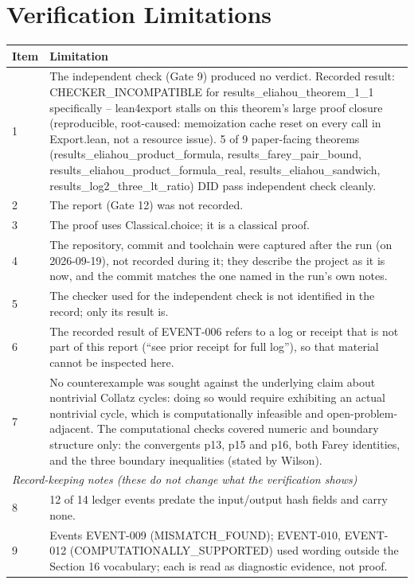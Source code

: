 \documentclass[11pt]{article}
\begin{document}
\section{Verification Limitations}
\begin{longtable}{p{}p{}}
\toprule Item & Limitation \\ \midrule \endhead
1 & The independent check (Gate 9) produced no verdict. Recorded result: CHECKER\_INCOMPATIBLE for results\_eliahou\_theorem\_1\_1 specifically -- lean4export stalls on this theorem's large proof closure (reproducible, root-caused: memoization cache reset on every call in Export.lean, not a resource issue). 5 of 9 paper-facing theorems (results\_eliahou\_product\_formula, results\_farey\_pair\_bound, results\_eliahou\_product\_formula\_real, results\_eliahou\_sandwich, results\_log2\_three\_lt\_ratio) DID pass independent check cleanly. \\
2 & The report (Gate 12) was not recorded. \\
3 & The proof uses Classical.choice; it is a classical proof. \\
4 & The repository, commit and toolchain were captured after the run (on 2026-09-19), not recorded during it; they describe the project as it is now, and the commit matches the one named in the run's own notes. \\
5 & The checker used for the independent check is not identified in the record; only its result is. \\
6 & The recorded result of EVENT-006 refers to a log or receipt that is not part of this report (``see prior receipt for full log''), so that material cannot be inspected here. \\
7 & No counterexample was sought against the underlying claim about nontrivial Collatz cycles: doing so would require exhibiting an actual nontrivial cycle, which is computationally infeasible and open-problem-adjacent. The computational checks covered numeric and boundary structure only: the convergents p13, p15 and p16, both Farey identities, and the three boundary inequalities (stated by Wilson). \\
\midrule \multicolumn{2}{l}{\textit{Record-keeping notes (these do not change what the verification shows)}} \\ \midrule
8 & 12 of 14 ledger events predate the input/output hash fields and carry none. \\
9 & Events EVENT-009 (MISMATCH\_FOUND); EVENT-010, EVENT-012 (COMPUTATIONALLY\_SUPPORTED) used wording outside the Section 16 vocabulary; each is read as diagnostic evidence, not proof. \\
\bottomrule
\end{longtable}
\end{document}
